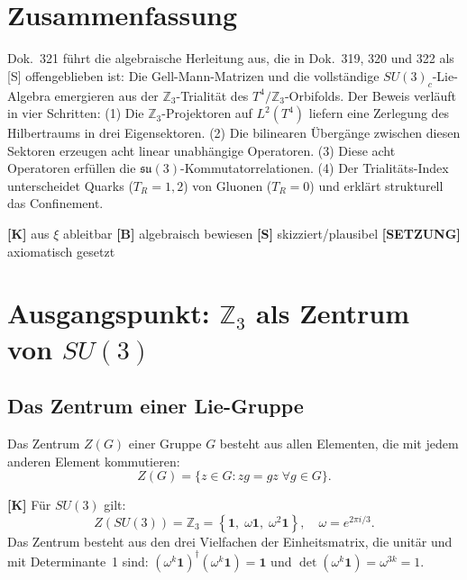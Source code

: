 

\section*{Zusammenfassung}

Dok.~321 führt die algebraische Herleitung aus, die in Dok.~319, 320 und 322
als [S] offengeblieben ist: Die Gell-Mann-Matrizen und die vollständige
$SU(3)_c$-Lie-Algebra emergieren aus der $\mathbb{Z}_3$-Trialität des
$T^4/\mathbb{Z}_3$-Orbifolds. Der Beweis verläuft in vier Schritten:
(1) Die $\mathbb{Z}_3$-Projektoren auf $L^2(T^4)$ liefern eine Zerlegung
des Hilbertraums in drei Eigensektoren.
(2) Die bilinearen Übergänge zwischen diesen Sektoren erzeugen acht
linear unabhängige Operatoren.
(3) Diese acht Operatoren erfüllen die $\mathfrak{su}(3)$-Kommutatorrelationen.
(4) Der Trialitäts-Index unterscheidet Quarks ($T_R = 1,2$) von Gluonen
($T_R = 0$) und erklärt strukturell das Confinement.

\begin{keyresult}[Statusmarkierung]
\textbf{[K]} aus $\xi$ ableitbar \quad
\textbf{[B]} algebraisch bewiesen \quad
\textbf{[S]} skizziert/plausibel \quad
\textbf{[SETZUNG]} axiomatisch gesetzt
\end{keyresult}

\section{Ausgangspunkt: $\mathbb{Z}_3$ als Zentrum von $SU(3)$}

\subsection{Das Zentrum einer Lie-Gruppe}

Das Zentrum $Z(G)$ einer Gruppe $G$ besteht aus allen Elementen,
die mit jedem anderen Element kommutieren:
\begin{equation}
  Z(G) = \{z \in G : zg = gz \;\forall g \in G\}.
\end{equation}

\textbf{[K]} Für $SU(3)$ gilt:
\begin{equation}
  Z(SU(3)) = \mathbb{Z}_3 =
  \left\{ \mathbf{1},\; \omega\mathbf{1},\; \omega^2\mathbf{1} \right\},
  \quad \omega = e^{2\pi i/3}.
  \label{eq:zentrumZ3}
\end{equation}
Das Zentrum besteht aus den drei Vielfachen der Einheitsmatrix, die
unitär und mit Determinante~1 sind: $(\omega^k\mathbf{1})^\dagger
(\omega^k\mathbf{1}) = \mathbf{1}$ und $\det(\omega^k\mathbf{1})
= \omega^{3k} = 1$.

